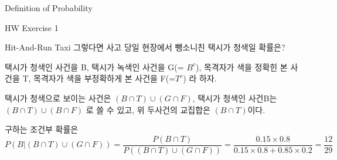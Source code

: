 \begin{edXchapter}{Definition of Probability}
\begin{edXsection}{HW Exercise 1}
\begin{edXvertical}
\begin{edXproblem}{Hit-And-Run Taxi}
그렇다면 사고 당일 현장에서 뺑소니친 택시가 청색일 확률은?
\begin{edXsolution}
택시가 청색인 사건을 B, 택시가 녹색인 사건을 G(= $B^c$), \newline
목격자가 색을 정확힌 본 사건을 T, 목격자가 색을 부정확하게 본 사건을 F(=$T^c$)
라 하자.

택시가 청색으로 보이는 사건은 $(B \cap T) \cup (G \cap F)$,
택시가 청색인 사건B는  $(B \cap T) \cup (B \cap F)$ 로 쓸 수 있고,
위 두사건의 교집합은 $(B \cap T)$이다.

구하는 조건부 확률은 
\begin{equation}
P(B |(B \cap T) \cup (G \cap F)) = \frac{P(B \cap T)}{P((B \cap T) \cup (G \cap F))} = \frac{0.15 \times 0.8}{0.15 \times 0.8 + 0.85 \times 0.2} = \frac{12}{29}
\end{equation}
\end{edXsolution}
\end{edXproblem}

\end{edXvertical}
\end{edXsection}
\end{edXchapter}
